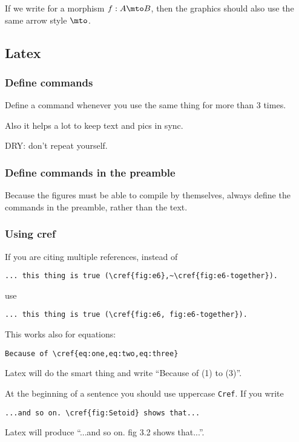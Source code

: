 If we write for a morphism $f: A \mto B$, then the graphics should also use the same arrow style $\mto$.


\subsection*{Latex}

\subsubsection*{Define commands }

Define a command whenever you use the same thing for more than 3 times.

Also it helps a lot to keep text and pics in sync.

DRY: don't repeat yourself.



\subsubsection*{Define commands in the preamble }

Because the figures must be able to compile by themselves, always define the commands in the preamble, rather than the text.

\subsubsection*{Using cref}

If you are citing multiple references, instead of 
% 
\begin{verbatim}
... this thing is true (\cref{fig:e6},~\cref{fig:e6-together}).
\end{verbatim}
% 
use
% 
\begin{verbatim}
... this thing is true (\cref{fig:e6, fig:e6-together}).
\end{verbatim}
% 
This works also for equations:
% 
\begin{verbatim}
Because of \cref{eq:one,eq:two,eq:three}
\end{verbatim}
% 
Latex will do the smart thing and write ``Because of (1) to (3)''.

At the beginning of a sentence you should use uppercase \texttt{Cref}.
If you write 
% 
\begin{verbatim}
...and so on. \cref{fig:Setoid} shows that...
\end{verbatim}
% 
Latex will produce ``...and so on. fig 3.2 shows that...''.

